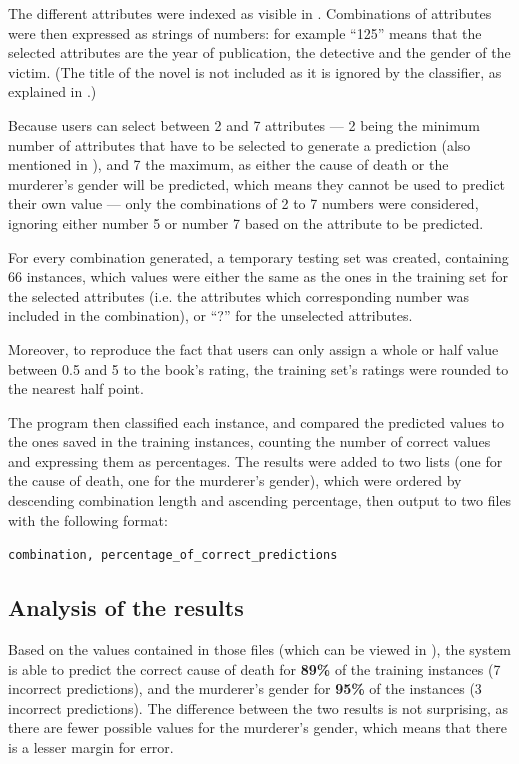 \documentclass{mproj}
\begin{document}
The different attributes were indexed as visible in . Combinations of attributes were then expressed as strings of numbers: for example ``125'' means that the selected attributes are the year of publication, the detective and the gender of the victim. (The title of the novel is not included as it is ignored by the classifier, as explained in .)

Because users can select between 2 and 7 attributes --- 2 being the minimum number of attributes that have to be selected to generate a prediction (also mentioned in ), and 7 the maximum, as either the cause of death or the murderer's gender will be predicted, which means they cannot be used to predict their own value --- only the combinations of 2 to 7 numbers were considered, ignoring either number 5 or number 7 based on the attribute to be predicted.

For every combination generated, a temporary testing set was created, containing 66 instances, which values were either the same as the ones in the training set for the selected attributes (i.e. the attributes which corresponding number was included in the combination), or ``?'' for the unselected attributes.

Moreover, to reproduce the fact that users can only assign a whole or half value between 0.5 and 5 to the book's rating, the training set's ratings were rounded to the nearest half point.

The program then classified each instance, and compared the predicted values to the ones saved in the training instances, counting the number of correct values and expressing them as percentages. The results were added to two lists (one for the cause of death, one for the murderer's gender), which were ordered by descending combination length and ascending percentage, then output to two files with the following format: 
\begin{center}
	\vspace{-5mm}
	\verb|combination, percentage_of_correct_predictions|
\end{center}

\subsection*{Analysis of the results}

Based on the values contained in those files (which can be viewed in ), the system is able to predict the correct cause of death for \textbf{89\%} of the training instances (7 incorrect predictions), and the murderer's gender for \textbf{95\%} of the instances (3 incorrect predictions). The difference between the two results is not surprising, as there are fewer possible values for the murderer's gender, which means that there is a lesser margin for error.
\end{document}
